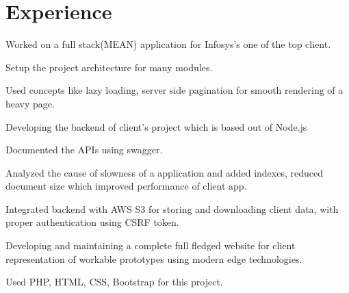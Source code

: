 \documentclass[]{deedy-resume-openfont}
\begin{document}
\begin{minipage}[t]{0.66\textwidth} 


\section{Experience}

\vspace{\topsep} %
\begin{tightemize}
\item Worked on a full stack(MEAN) application for Infosys's one of the top client.
\item Setup the project architecture for many modules.
\item Used concepts like lazy loading, server side pagination for smooth rendering of a heavy page.
\end{tightemize}
\sectionsep

\begin{tightemize}
\item Developing the backend of client's project which is based out of Node.js
\item Documented the APIs using swagger.
\item Analyzed the cause of slowness of a application and added indexes, reduced document size which improved performance of client app.
\item Integrated backend with AWS S3 for storing and downloading client data, with proper authentication using CSRF token.
\end{tightemize}
\sectionsep

\begin{tightemize}
\item Developing and maintaining a complete full fledged website for client representation of workable prototypes using modern edge technologies.
\item Used PHP, HTML, CSS, Bootstrap for this project.
\end{tightemize}
\sectionsep



\end{minipage}
\end{document}
